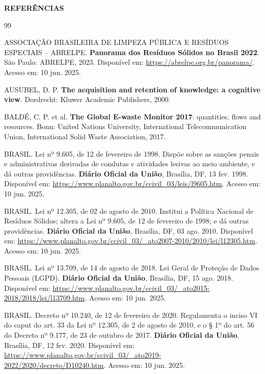 \documentclass[12pt, a4paper]{article}
\numberwithin{equation}{section}
\numberwithin{figure}{section}
\numberwithin{table}{section}
\begin{document}
\clearpage
\begin{center}
  {\normalsize\bfseries REFERÊNCIAS}
\end{center}

\begin{thebibliography}{99}

ASSOCIAÇÃO BRASILEIRA DE LIMPEZA PÚBLICA E RESÍDUOS ESPECIAIS -- ABRELPE.
\textbf{Panorama dos Resíduos Sólidos no Brasil 2022}. São Paulo: ABRELPE,
2023. Disponível em: \url{https://abrelpe.org.br/panorama/}. Acesso em:
10 jun. 2025.

AUSUBEL, D. P.
\textbf{The acquisition and retention of knowledge: a cognitive view}.
Dordrecht: Kluwer Academic Publishers, 2000.

BALDÉ, C. P. et al.
\textbf{The Global E-waste Monitor 2017}: quantities, flows and resources.
Bonn: United Nations University, International Telecommunication Union,
International Solid Waste Association, 2017.

BRASIL. Lei nº 9.605, de 12 de fevereiro de 1998. Dispõe sobre as sanções
penais e administrativas derivadas de condutas e atividades lesivas ao meio
ambiente, e dá outras providências.
\textbf{Diário Oficial da União}, Brasília, DF, 13 fev. 1998. Disponível em:
\url{https://www.planalto.gov.br/ccivil_03/leis/l9605.htm}. Acesso em:
10 jun. 2025.

BRASIL. Lei nº 12.305, de 02 de agosto de 2010. Institui a Política Nacional
de Resíduos Sólidos; altera a Lei nº 9.605, de 12 de fevereiro de 1998; e dá
outras providências.
\textbf{Diário Oficial da União}, Brasília, DF, 03 ago. 2010. Disponível em:
\url{https://www.planalto.gov.br/ccivil_03/_ato2007-2010/2010/lei/l12305.htm}.
Acesso em: 10 jun. 2025.

BRASIL. Lei nº 13.709, de 14 de agosto de 2018. Lei Geral de Proteção de
Dados Pessoais (LGPD).
\textbf{Diário Oficial da União}, Brasília, DF, 15 ago. 2018. Disponível em:
\url{https://www.planalto.gov.br/ccivil_03/_ato2015-2018/2018/lei/l13709.htm}.
Acesso em: 10 jun. 2025.

BRASIL. Decreto nº 10.240, de 12 de fevereiro de 2020. Regulamenta o inciso VI
do caput do art. 33 da Lei nº 12.305, de 2 de agosto de 2010, e o § 1º do art.
56 do Decreto nº 9.177, de 23 de outubro de 2017.
\textbf{Diário Oficial da União}, Brasília, DF, 12 fev. 2020. Disponível em:
\url{https://www.planalto.gov.br/ccivil_03/_ato2019-2022/2020/decreto/D10240.htm}.
Acesso em: 10 jun. 2025.


\end{thebibliography}
\end{document}
